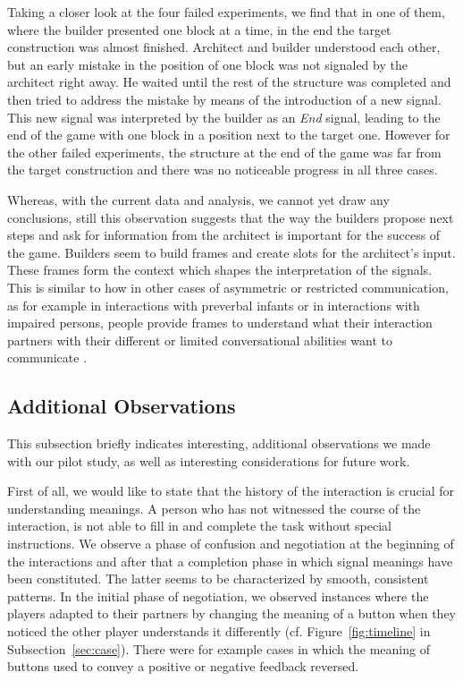 Taking a closer look at the four failed experiments, we find that in one of them, where the builder presented one block at a time, in the end the target construction was almost finished. Architect and builder understood each other, but an early mistake in the position of one block was not signaled by the architect right away. He waited until the rest of the structure was completed and then tried to address the mistake by means of the introduction of a new signal. This new signal was interpreted by the builder as an \emph{End} signal, leading to the end of the game with one block in a position next to the target one. However for the other failed experiments, the structure at the end of the game was far from the target construction and there was no noticeable progress in all three cases.

Whereas, with the current data and analysis, we cannot yet draw any conclusions, still this observation suggests that the way the builders propose next steps and ask for information from the architect is important for the success of the game. Builders seem to build frames and create slots for the architect's input. These frames form the context which shapes the interpretation of the signals. This is similar to how in other cases of asymmetric or restricted communication, as for example in interactions with preverbal infants or in interactions with impaired persons, people provide frames to understand what their interaction partners with their different or limited conversational abilities want to communicate \cite{ochs1979propositions, goodwin1995co}.

\subsection{Additional Observations}

This subsection briefly indicates interesting, additional observations we made with our pilot study, as well as interesting considerations for future work.

First of all, we would like to state that the history of the interaction is crucial for understanding meanings. A person who has not witnessed the course of the interaction, is not able to fill in and complete the task without special instructions. We observe a phase of confusion and negotiation at the beginning of the interactions and after that a completion phase in which signal meanings have been constituted. The latter seems to be characterized by smooth, consistent patterns. In the initial phase of negotiation, we observed instances where the players adapted to their partners by changing the meaning of a button when they noticed the other player understands it differently (cf. Figure~\ref{fig:timeline} in Subsection~\ref{sec:case}). There were for example cases in which the meaning of buttons used to convey a positive or negative feedback reversed.


